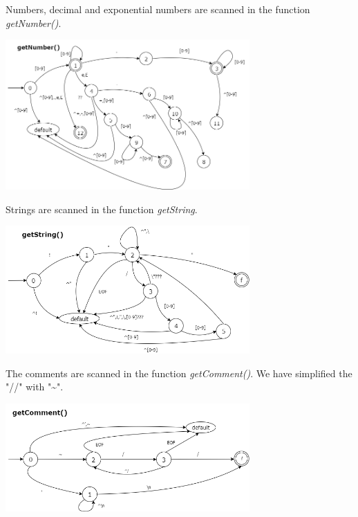 \documentclass[12pt,a4paper,titlepage]{article}
\begin{document}
\begin{justify}
Numbers, decimal and exponential numbers are scanned in the function \textit{getNumber()}.
\end{justify}
\begin{center}
  \includegraphics[width=0.7\textwidth]{img/getNumber.png}
\end{center}

\begin{justify}
Strings are scanned in the function \textit{getString}.
\end{justify}
\begin{center}
  \includegraphics[width=0.7\textwidth]{img/getString.png}
\end{center}

\begin{justify}
The comments are scanned in the function \textit{getComment()}. We have simplified the "//" with "\textasciitilde".
\end{justify}
\begin{center}
  \includegraphics[width=0.7\textwidth]{img/getComment.png}
\end{center}
\end{document}
